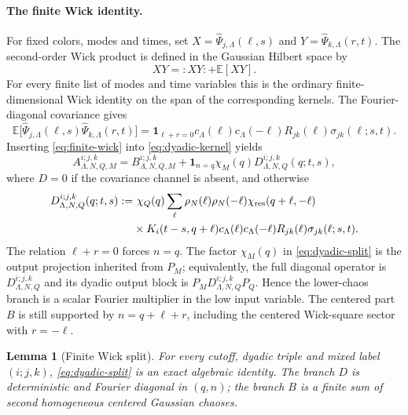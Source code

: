 \documentclass[11pt,reqno]{amsart}
\numberwithin{equation}{section}
\theoremstyle{plain}
\newtheorem{lemma}[theorem]{Lemma}
\theoremstyle{definition}
\newcommand{\E}{\mathbb E}
\newcommand{\one}{\mathbf 1}
\newcommand{\wh}{\widehat}
\newcommand{\wick}[1]{:#1:}
\begin{document}
\paragraph{The finite Wick identity.}
For fixed colors, modes and times, set \(X=\wh\Psi_{j,\Lambda}(\ell,s)\) and \(Y=\wh\Psi_{k,\Lambda}(r,t)\).  The second-order Wick product is defined in the Gaussian Hilbert space by
\begin{equation}\label{eq:finite-wick}
        XY=\wick{XY}+
        \E[XY].
\end{equation}
For every finite list of modes and time variables this is the ordinary finite-dimensional Wick identity on the span of the corresponding kernels.
The Fourier-diagonal covariance gives
\begin{equation}\label{eq:finite-cov}
        \E\bigl[\wh\Psi_{j,\Lambda}(\ell,s)\wh\Psi_{k,\Lambda}(r,t)\bigr]
        =\one_{\ell+r=0}c_\Lambda(\ell)c_\Lambda(-\ell)R_{jk}(\ell)\sigma_{jk}(\ell;s,t).
\end{equation}
Inserting \eqref{eq:finite-wick} into \eqref{eq:dyadic-kernel} yields
\begin{equation}\label{eq:dyadic-split}
        A_{\Lambda,N,Q,M}^{i;j,k}=B_{\Lambda,N,Q,M}^{i;j,k}+
        \one_{n=q}\chi_M(q)D_{\Lambda,N,Q}^{i;j,k}(q;t,s),
\end{equation}
where \(D=0\) if the covariance channel is absent, and otherwise
\begin{equation}\label{eq:D-kernel}
\begin{aligned}
        D_{\Lambda,N,Q}^{i;j,k}(q;t,s)
        :=&\ \chi_Q(q)
        \sum_\ell \rho_N(\ell)\rho_N(-\ell)
        \chi_{\rm res}(q+\ell,-\ell)\\
        &\times K_i(t-s,q+\ell)c_\Lambda(\ell)c_\Lambda(-\ell)
        R_{jk}(\ell)\sigma_{jk}(\ell;s,t).
\end{aligned}
\end{equation}
The relation \(\ell+r=0\) forces \(n=q\).  The factor \(\chi_M(q)\) in \eqref{eq:dyadic-split} is the output projection inherited from \(P_M\); equivalently, the full diagonal operator is \(D_{\Lambda,N,Q}^{i;j,k}\) and its dyadic output block is \(P_MD_{\Lambda,N,Q}^{i;j,k}P_Q\).  Hence the lower-chaos branch is a scalar Fourier multiplier in the low input variable.  The centered part \(B\) is still supported by \(n=q+\ell+r\), including the centered Wick-square sector with \(r=-\ell\).

\begin{lemma}[Finite Wick split]\label{lem:color-split}
For every cutoff, dyadic triple and mixed label \((i;j,k)\), \eqref{eq:dyadic-split} is an exact algebraic identity.  The branch \(D\) is deterministic and Fourier diagonal in \((q,n)\); the branch \(B\) is a finite sum of second homogeneous centered Gaussian chaoses.
\end{lemma}
\end{document}
